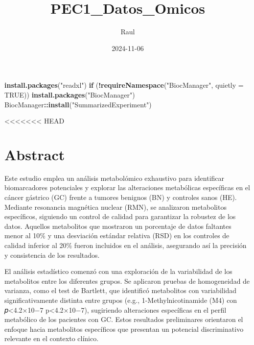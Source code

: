 \documentclass[
]{article}
\title{PEC1\_Datos\_Omicos}
\author{Raul}
\date{2024-11-06}
\newenvironment{Shaded}{\begin{snugshade}}{\end{snugshade}}
\newcommand{\AttributeTok}[1]{\textcolor[rgb]{0.13,0.29,0.53}{#1}}
\newcommand{\ConstantTok}[1]{\textcolor[rgb]{0.56,0.35,0.01}{#1}}
\newcommand{\ControlFlowTok}[1]{\textcolor[rgb]{0.13,0.29,0.53}{\textbf{#1}}}
\newcommand{\FunctionTok}[1]{\textcolor[rgb]{0.13,0.29,0.53}{\textbf{#1}}}
\newcommand{\NormalTok}[1]{#1}
\newcommand{\SpecialCharTok}[1]{\textcolor[rgb]{0.81,0.36,0.00}{\textbf{#1}}}
\newcommand{\StringTok}[1]{\textcolor[rgb]{0.31,0.60,0.02}{#1}}
\begin{document}
\maketitle

{
\setcounter{tocdepth}{3}
\tableofcontents
}
\begin{Shaded}
\begin{Highlighting}[]
\FunctionTok{install.packages}\NormalTok{(}\StringTok{"readxl"}\NormalTok{)}
\ControlFlowTok{if}\NormalTok{ (}\SpecialCharTok{!}\FunctionTok{requireNamespace}\NormalTok{(}\StringTok{"BiocManager"}\NormalTok{, }\AttributeTok{quietly =} \ConstantTok{TRUE}\NormalTok{))}
    \FunctionTok{install.packages}\NormalTok{(}\StringTok{"BiocManager"}\NormalTok{)}
\NormalTok{BiocManager}\SpecialCharTok{::}\FunctionTok{install}\NormalTok{(}\StringTok{"SummarizedExperiment"}\NormalTok{)}
\end{Highlighting}
\end{Shaded}

\textless\textless\textless\textless\textless\textless\textless{} HEAD

\section{Abstract}\label{abstract}

Este estudio emplea un análisis metabolómico exhaustivo para identificar
biomarcadores potenciales y explorar las alteraciones metabólicas
específicas en el cáncer gástrico (GC) frente a tumores benignos (BN) y
controles sanos (HE). Mediante resonancia magnética nuclear (RMN), se
analizaron metabolitos específicos, siguiendo un control de calidad para
garantizar la robustez de los datos. Aquellos metabolitos que mostraron
un porcentaje de datos faltantes menor al 10\% y una desviación estándar
relativa (RSD) en los controles de calidad inferior al 20\% fueron
incluidos en el análisis, asegurando así la precisión y consistencia de
los resultados.

El análisis estadístico comenzó con una exploración de la variabilidad
de los metabolitos entre los diferentes grupos. Se aplicaron pruebas de
homogeneidad de varianza, como el test de Bartlett, que identificó
metabolitos con variabilidad significativamente distinta entre grupos
(e.g., 1-Methylnicotinamide (M4) con 𝑝\textless4.2×10−7
p\textless4.2×10−7), sugiriendo alteraciones específicas en el perfil
metabólico de los pacientes con GC. Estos resultados preliminares
orientaron el enfoque hacia metabolitos específicos que presentan un
potencial discriminativo relevante en el contexto clínico.
\end{document}
